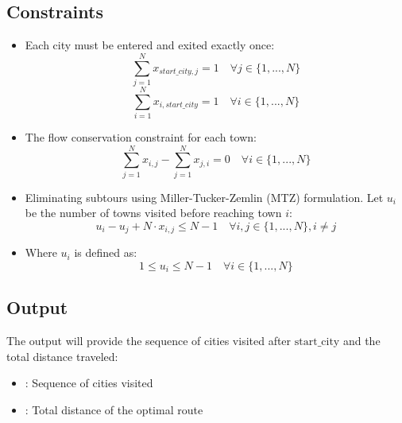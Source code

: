 \documentclass{article}
\begin{document}
\subsection*{Constraints}
\begin{itemize}
    \item Each city must be entered and exited exactly once:
    \[
    \sum_{j=1}^{N} x_{start\_city,j} = 1  \quad \forall j \in \{1, ..., N\}
    \]
    \[
    \sum_{i=1}^{N} x_{i,start\_city} = 1 \quad \forall i \in \{1, ..., N\}
    \]
    
    \item The flow conservation constraint for each town:
    \[
    \sum_{j=1}^{N} x_{i,j} - \sum_{j=1}^{N} x_{j,i} = 0 \quad \forall i \in \{1, ..., N\}
    \]
    
    \item Eliminating subtours using Miller-Tucker-Zemlin (MTZ) formulation. Let \( u_i \) be the number of towns visited before reaching town \( i \):
    \[
    u_i - u_j + N \cdot x_{i,j} \leq N-1 \quad \forall i,j \in \{1, ..., N\}, i \neq j
    \]
    \item Where \( u_i \) is defined as:
    \[
    1 \leq u_i \leq N-1 \quad \forall i \in \{1, ..., N\}
    \]
\end{itemize}

\subsection*{Output}
The output will provide the sequence of cities visited after \( \text{start\_city} \) and the total distance traveled:
\begin{itemize}
    \item {}: Sequence of cities visited
    \item {}: Total distance of the optimal route
\end{itemize}
\end{document}
